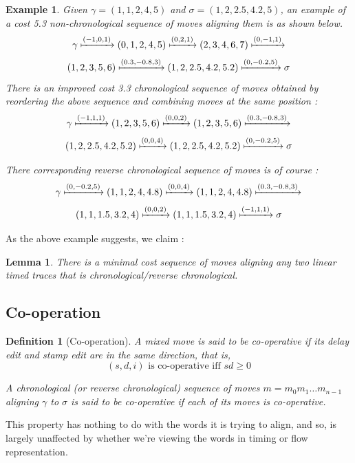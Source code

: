 \documentclass[conference]{IEEEtran}
\newtheorem{lemma}[theorem]{Lemma}
\newtheorem{definition}{Definition}
\newtheorem{example}{Example}
\begin{document}
	\begin{example}
		
		Given $\gamma = (1, 1, 2, 4, 5)$ and $\sigma = (1, 2, 2.5, 4.2, 5)$, an example of a cost 5.3 non-chronological sequence of moves aligning them is as shown below. 
		$$\gamma \xmapsto{(-1, 0, 1)} (0, 1, 2, 4, 5) \xmapsto{(0, 2, 1)} (2, 3, 4, 6, 7) \xmapsto{(0, -1, 1)} $$
		$$(1, 2, 3, 5, 6) \xmapsto{(0.3, -0.8, 3)} (1, 2, 2.5, 4.2, 5.2) \xmapsto{(0, -0.2, 5)} \sigma$$
		There is an improved cost 3.3 chronological sequence of moves obtained by reordering the above sequence and combining moves at the same position : 
		$$\gamma \xmapsto{(-1, 1, 1)} (1, 2, 3, 5, 6) \xmapsto{(0, 0, 2)} (1, 2, 3, 5, 6) \xmapsto{(0.3, -0.8, 3)}  $$
		$$ (1, 2, 2.5, 4.2, 5.2) \xmapsto{(0, 0, 4)} (1, 2, 2.5, 4.2, 5.2) \xmapsto{(0, -0.2, 5)} \sigma $$
		
		There corresponding reverse chronological sequence of moves is of course : 
		$$\gamma \xmapsto{(0, -0.2, 5)} (1, 1, 2, 4, 4.8) \xmapsto{(0, 0, 4)} (1, 1, 2, 4, 4.8) \xmapsto{(0.3, -0.8, 3)} $$
		$$(1, 1, 1.5, 3.2, 4)\xmapsto{(0, 0, 2)} (1, 1, 1.5, 3.2, 4)\xmapsto{(-1, 1, 1)} \sigma $$
		
	\end{example}
	
	As the above example suggests, we claim : 
	
	\begin{lemma}\label{linescommute} There is a minimal cost sequence of moves aligning any two linear timed traces that is chronological/reverse chronological. 
	\end{lemma}
	
	\subsection{Co-operation}
	
	\begin{definition}[Co-operation]
		A mixed move is said to be co-operative if its delay edit and stamp edit are in the same direction, that is, 
		$$(s, d, i) \textrm{ is co-operative iff } sd \geq 0$$
		
		A chronological (or reverse chronological) sequence of moves $m = m_0m_1\dots m_{n-1}$ aligning $\gamma$ to $\sigma$ is said to be \textit{co-operative} if each of its moves is co-operative. 
	\end{definition}
	
	This property has nothing to do with the words it is trying to align, and so, is largely unaffected by whether we're viewing the words in timing or flow representation. 
	
\end{document}
